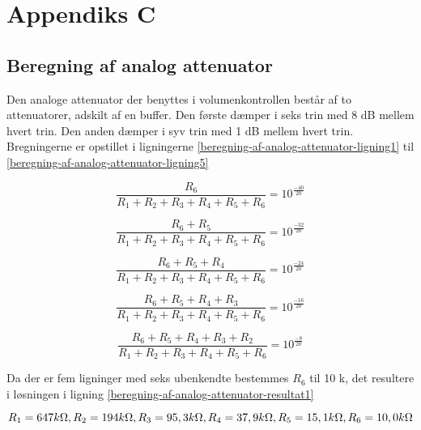 \chapter{Appendiks C}
\label{beregning-af-analog-attenuator}
\section*{Beregning af analog attenuator}

Den analoge attenuator der benyttes i volumenkontrollen består af to attenuatorer, adskilt af en buffer. Den første dæmper i seks trin med 8 dB mellem hvert trin. Den anden dæmper i syv trin med 1 dB mellem hvert trin. Bregningerne er opstillet i ligningerne \ref{beregning-af-analog-attenuator-ligning1} til \ref{beregning-af-analog-attenuator-ligning5}

\begin{equation}
\label{beregning-af-analog-attenuator-ligning1}
\frac{R_6}{R_1 + R_2 + R_3 + R_4 + R_5 + R_6} = 10^{\frac{-40}{20}}
\end{equation}

\begin{equation}
\frac{R_6 + R_5}{R_1 + R_2 + R_3 + R_4 + R_5 + R_6} = 10^{\frac{-32}{20}}
\end{equation}

\begin{equation}
\frac{R_6 + R_5 + R_4}{R_1 + R_2 + R_3 + R_4 + R_5 + R_6} = 10^{\frac{-24}{20}}
\end{equation}

\begin{equation}
\frac{R_6 + R_5 + R_4 + R_3}{R_1 + R_2 + R_3 + R_4 + R_5 + R_6} = 10^{\frac{-16}{20}}
\end{equation}

\begin{equation}
\label{beregning-af-analog-attenuator-ligning5}
\frac{R_6 + R_5 + R_4 + R_3 + R_2}{R_1 + R_2 + R_3 + R_4 + R_5 + R_6} = 10^{\frac{-8}{20}}
\end{equation}

Da der er fem ligninger med seks ubenkendte bestemmes $R_6$ til 10 k\ohm, det resultere i løsningen i ligning \ref{beregning-af-analog-attenuator-resultat1}

\begin{equation}
\label{beregning-af-analog-attenuator-resultat1}
R_1 = 647 k\ohm, R_2 = 194 k\ohm, R_3 = 95,3 k\ohm, R_4 = 37,9 k\ohm, R_5 = 15,1  k\ohm, R_6 = 10,0 k\ohm
\end{equation}